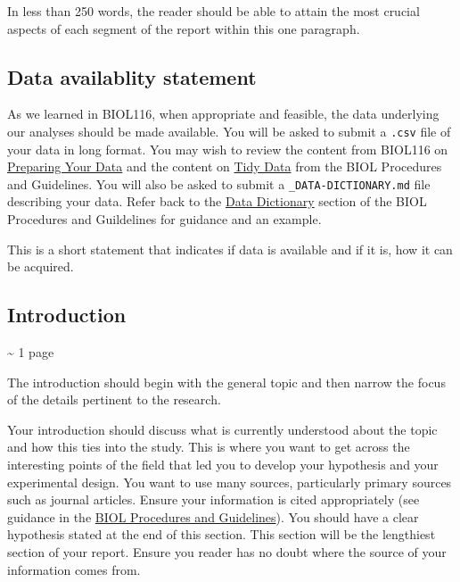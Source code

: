 \documentclass[
]{book}
\begin{document}
In less than 250 words, the reader should be able to attain the most crucial aspects of each segment of the report within this one paragraph.

\hypertarget{data-availablity-statement}{%
\subsection*{Data availablity statement}\label{data-availablity-statement}}

As we learned in BIOL116, when appropriate and feasible, the data underlying our analyses should be made available. You will be asked to submit a \texttt{.csv} file of your data in long format. You may wish to review the content from BIOL116 on \href{https://ubco-biology.github.io/BIOL-116-Lab-Manual/preparing-your-data.html}{Preparing Your Data} and the content on \href{https://ubco-biology.github.io/Procedures-and-Guidelines/tidy-data.html}{Tidy Data} from the BIOL Procedures and Guidelines. You will also be asked to submit a \texttt{\_DATA-DICTIONARY.md} file describing your data. Refer back to the \href{https://ubco-biology.github.io/Procedures-and-Guidelines/data-dictionary.html}{Data Dictionary} section of the BIOL Procedures and Guildelines for guidance and an example.

This is a short statement that indicates if data is available and if it is, how it can be acquired.

\hypertarget{introduction}{%
\subsection*{Introduction}\label{introduction}}

\textasciitilde{} 1 page

The introduction should begin with the general topic and then narrow the focus of the details pertinent to the research.

Your introduction should discuss what is currently understood about the topic and how this ties into the study. This is where you want to get across the interesting points of the field that led you to develop your hypothesis and your experimental design. You want to use many sources, particularly primary sources such as journal articles. Ensure your information is cited appropriately (see guidance in the \href{https://ubco-biology.github.io/Procedures-and-Guidelines/apa-citations.html}{BIOL Procedures and Guidelines}). You should have a clear hypothesis stated at the end of this section. This section will be the lengthiest section of your report. Ensure you reader has no doubt where the source of your information comes from.
\end{document}
